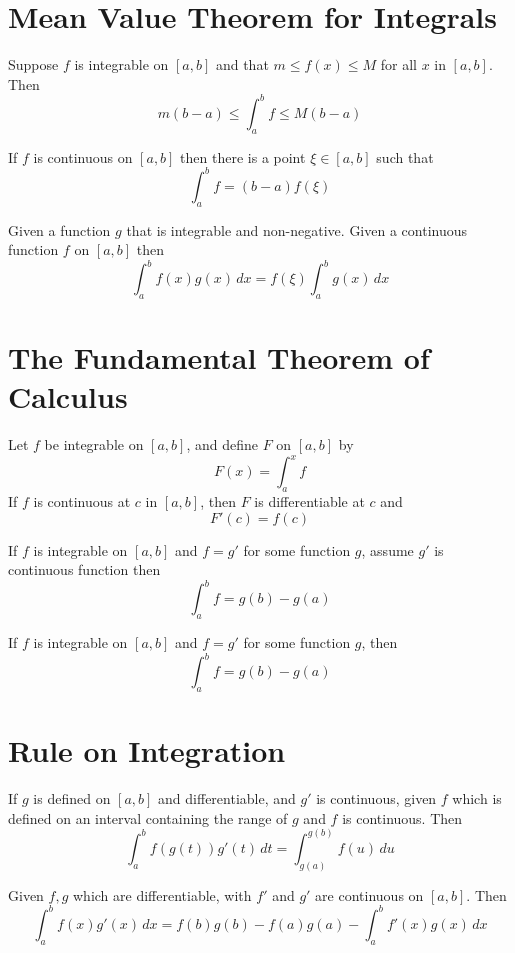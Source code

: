 \section{Mean Value Theorem for Integrals}
\begin{theorem*}
  Suppose $f$ is integrable on $[a, b]$ and that $m \le f(x) \le M$ for all $x$ in $[a, b]$.
  Then 
  \[m(b-a) \le \int_a^b f \le M(b-a)\]
\end{theorem*}
\begin{theorem*}
  If $f$ is continuous on $[a, b]$ then there is a point $\xi \in [a, b]$ such that 
  \[\int_a^b f = (b-a)f(\xi)\]
\end{theorem*}
\begin{theorem*}
  Given a function $g$ that is integrable and non-negative. Given a continuous function $f$ on $[a, b]$ then
  \[ \int_a^b f(x)g(x)\,dx = f(\xi)\int_a^b g(x)\,dx\]
\end{theorem*}

\section{The Fundamental Theorem of Calculus}

\begin{theorem*}
  Let $f$ be integrable on $[a, b]$, and define $F$ on $[a, b]$ by
  \[F(x) = \int_a^x f\]
  If $f$ is continuous at $c$ in $[a, b]$, then $F$ is differentiable at $c$ and 
  \[F'(c) = f(c)\]
\end{theorem*}

\begin{theorem*}
  If $f$ is integrable on $[a, b]$ and $f = g'$ for some function $g$, assume $g'$ is continuous function then 
  \[\int_a^b f = g(b) - g(a)\]
\end{theorem*}

\begin{theorem*}
  If $f$ is integrable on $[a, b]$ and $f = g'$ for some function $g$, then 
  \[\int_a^b f = g(b) - g(a)\]
\end{theorem*}

\section{Rule on Integration}

\begin{theorem*}
  If $g$ is defined on $[a, b]$ and differentiable, and $g'$ is continuous, given $f$ which is defined on an interval containing the range of $g$ and $f$ is continuous.
  Then
  \[\int_a^bf(g(t))g'(t)\,dt = \int_{g(a)}^{g(b)}f(u)\,du\]
\end{theorem*}

\begin{theorem*}
  Given $f, g$ which are differentiable, with $f'$ and $g'$ are continuous on $[a, b]$.
  Then 
  \[\int_a^b f(x)g'(x)\,dx = f(b)g(b) - f(a)g(a) - \int_a^b f'(x)g(x)\,dx\]
\end{theorem*}